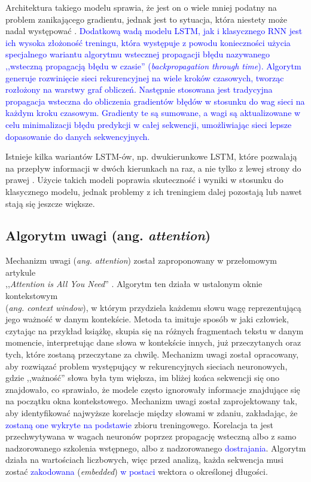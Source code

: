 \documentclass[data-science]{agh-wi} %
\begin{document}
Architektura takiego modelu sprawia, że jest on o wiele mniej podatny na problem zanikającego gradientu, jednak jest to sytuacja, która niestety może nadal występować \cite{vanishing_gradient}. \textcolor{blue}{Dodatkową wadą modelu LSTM, jak i klasycznego RNN jest ich wysoka złożoność treningu, która występuje z powodu konieczności użycia specjalnego wariantu algorytmu wstecznej propagacji błędu nazywanego ,,wsteczną propagacją błędu w czasie'' (\textit{backpropagation through time}). Algorytm generuje rozwinięcie sieci rekurencyjnej na wiele kroków czasowych, tworząc rozłożony na warstwy graf obliczeń. Następnie stosowana jest tradycyjna propagacja wsteczna do obliczenia gradientów błędów w stosunku do wag sieci na każdym kroku czasowym. Gradienty te są sumowane, a wagi są aktualizowane w celu minimalizacji błędu predykcji w całej sekwencji, umożliwiając sieci lepsze dopasowanie do danych sekwencyjnych.}

Istnieje kilka wariantów LSTM-ów, np. dwukierunkowe LSTM, które pozwalają na przepływ informacji w dwóch kierunkach na raz, a nie tylko z lewej strony do prawej \cite{bi_lstm}. Użycie takich modeli poprawia skuteczność i wyniki w stosunku do klasycznego modelu, jednak problemy z ich treningiem dalej pozostają lub nawet stają się jeszcze większe.

\subsection{Algorytm uwagi (ang. \textit{attention})}
\label{sec:attention}
Mechanizm uwagi (\textit{ang. attention}) został zaproponowany w przełomowym artykule \\,,\textit{Attention is All You Need}'' \cite{attention}. Algorytm ten działa w ustalonym oknie kontekstowym \\ (\textit{ang. context window}), w którym przydziela każdemu słowu wagę reprezentującą jego ważność w danym kontekście. Metoda ta imituje sposób w jaki człowiek, czytając na przykład książkę, skupia się na różnych fragmentach tekstu w danym momencie, interpretując dane słowa w kontekście innych, już przeczytanych oraz tych, które zostaną przeczytane za chwilę. Mechanizm uwagi został opracowany, aby rozwiązać problem występujący w rekurencyjnych sieciach neuronowych, gdzie ,,ważność'' słowa była tym większa, im bliżej końca sekwencji się ono znajdowało, co sprawiało, że modele często ignorowały informacje znajdujące się \\ na początku okna kontekstowego. Mechanizm uwagi został zaprojektowany tak, aby identyfikować najwyższe korelacje między słowami w zdaniu, zakładając, że \textcolor{blue}{zostaną one wykryte na podstawie} zbioru treningowego. Korelacja ta jest przechwytywana w wagach neuronów poprzez propagację wsteczną albo z samo nadzorowanego szkolenia wstępnego, albo z nadzorowanego \textcolor{blue}{dostrajania}. Algorytm działa na wartościach liczbowych, więc przed analizą, każda sekwencja musi zostać \textcolor{blue}{zakodowana} (\textit{embedded}) \textcolor{blue}{w postaci} wektora o określonej długości.
\end{document}
